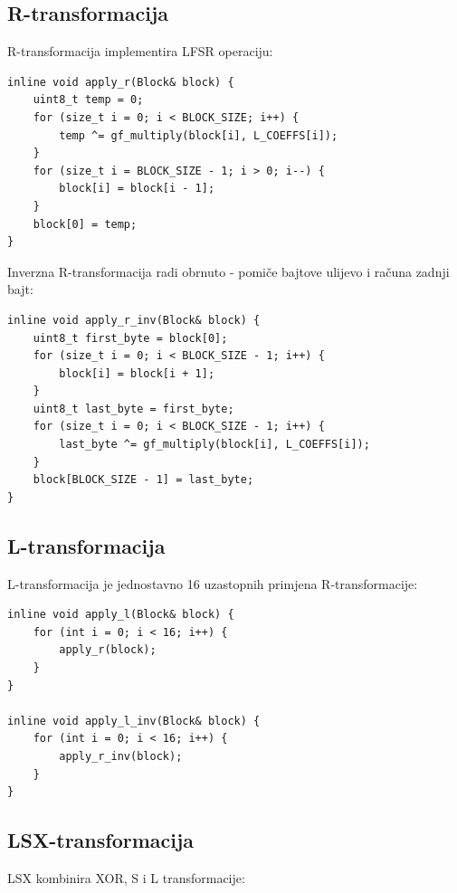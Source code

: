 \documentclass[12pt,a4paper]{article}
\begin{document}
\newpage
\subsection{R-transformacija}

R-transformacija implementira LFSR operaciju:

\begin{lstlisting}[style=cpp, caption={R-transformacija}, label={lst:r}]
inline void apply_r(Block& block) {
    uint8_t temp = 0;
    for (size_t i = 0; i < BLOCK_SIZE; i++) {
        temp ^= gf_multiply(block[i], L_COEFFS[i]);
    }
    for (size_t i = BLOCK_SIZE - 1; i > 0; i--) {
        block[i] = block[i - 1];
    }
    block[0] = temp;
}
\end{lstlisting}

Inverzna R-transformacija radi obrnuto - pomiče bajtove ulijevo i računa zadnji bajt:

\begin{lstlisting}[style=cpp, caption={Inverzna R-transformacija}, label={lst:rinv}]
inline void apply_r_inv(Block& block) {
    uint8_t first_byte = block[0];
    for (size_t i = 0; i < BLOCK_SIZE - 1; i++) {
        block[i] = block[i + 1];
    }
    uint8_t last_byte = first_byte;
    for (size_t i = 0; i < BLOCK_SIZE - 1; i++) {
        last_byte ^= gf_multiply(block[i], L_COEFFS[i]);
    }
    block[BLOCK_SIZE - 1] = last_byte;
}
\end{lstlisting}

\subsection{L-transformacija}

L-transformacija je jednostavno 16 uzastopnih primjena R-transformacije:

\begin{lstlisting}[style=cpp, caption={L-transformacija}, label={lst:l}]
inline void apply_l(Block& block) {
    for (int i = 0; i < 16; i++) {
        apply_r(block);
    }
}

inline void apply_l_inv(Block& block) {
    for (int i = 0; i < 16; i++) {
        apply_r_inv(block);
    }
}
\end{lstlisting}

\subsection{LSX-transformacija}

LSX kombinira XOR, S i L transformacije:
\end{document}
